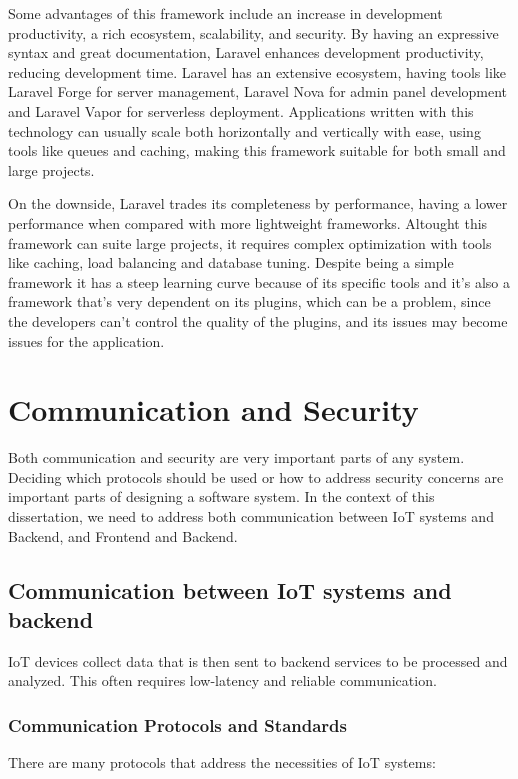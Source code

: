 Some advantages of this framework include an increase in development
productivity, a rich ecosystem, scalability, and security.
By having an expressive syntax and great documentation, Laravel enhances
development productivity, reducing development time.
Laravel has an extensive ecosystem, having tools like Laravel Forge for server
management, Laravel Nova for admin panel development and Laravel Vapor for
serverless deployment.
Applications written with this technology can usually scale both horizontally
and vertically with ease, using tools like queues and caching, making this
framework suitable for both small and large projects.

On the downside, Laravel trades its completeness by performance, having a
lower performance when compared with more lightweight frameworks.
Altought this framework can suite large projects, it requires complex
optimization with tools like caching, load balancing and database tuning.
Despite being a simple framework it has a steep learning curve because of its
specific tools and it's also a framework that's very dependent on its plugins,
which can be a problem, since the developers can't control the quality of the
plugins, and its issues may become issues for the application.

\section{Communication and Security}
Both communication and security are very important parts of any system.
Deciding which protocols should be used or how to address security concerns are
important parts of designing a software system. In the context of this
dissertation, we need to address both communication between \gls{IoT} systems and
Backend, and Frontend and Backend.


\subsection{Communication between IoT systems and backend}
\gls{IoT} devices collect data that is then sent to backend services to be processed
and analyzed. This often requires low-latency and reliable communication.
\subsubsection{Communication Protocols and Standards}
There are many protocols that address the necessities of \gls{IoT} systems:

